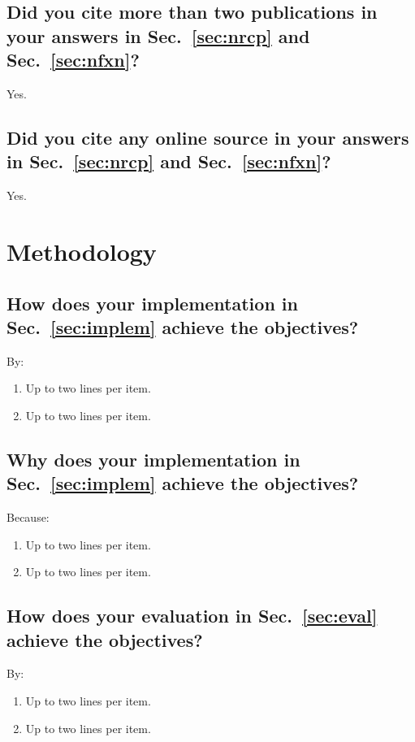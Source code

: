 \subsection{Did you cite more than two publications in your answers in Sec.~\ref{sec:nrcp} and Sec.~\ref{sec:nfxn}?}
Yes.
	
\subsection{Did you cite any online source in your answers in Sec.~\ref{sec:nrcp} and Sec.~\ref{sec:nfxn}?}
Yes.
  
	
	
	
	
	
	
	
	
	


\section{Methodology}

\subsection{How does your implementation in Sec.~\ref{sec:implem} achieve the objectives?}
By:
\begin{enumerate}
\item Up to two lines per item.
\item Up to two lines per item.
\end{enumerate}
	
\subsection{Why does your implementation in Sec.~\ref{sec:implem} achieve the objectives?}
Because:
\begin{enumerate}
\item Up to two lines per item.
\item Up to two lines per item.
\end{enumerate}
	
\subsection{How does your evaluation in Sec.~\ref{sec:eval} achieve the objectives?}
By:
\begin{enumerate}
\item Up to two lines per item.
\item Up to two lines per item.
\end{enumerate}
	
